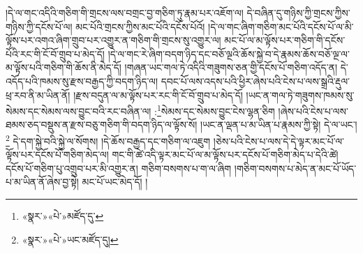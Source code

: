 །དེ་ལ་གང་འདིའི་གཅིག་གི་གྲངས་ལས་བགྲང་བྱ་གཅིག་ཏུ་རྣམ་པར་འཇོག་ལ། དེ་བཞིན་དུ་གཉིས་ཀྱི་གྲངས་ཀྱིས་གཉིས་ཀྱི་དངོས་པོ་ལ། མང་པོའི་གྲངས་ཀྱིས་མང་པོའི་དངོས་པོའོ། །དེ་ལ་གང་ཞིག་གཅིག་མང་པོའི་དངོས་པོ་ལ་མི་ལྟོས་པར་འགའ་ཞིག་གྲུབ་པར་འགྱུར་ན་གཅིག་གི་གྲངས་སུ་འགྱུར་ལ། མང་པོ་ལ་མ་ལྟོས་པར་གཅིག་གི་དངོས་པོའི་རང་གི་ངོ་བོ་གྲུབ་པ་མེད་དོ། །དེ་ལ་གང་རེ་ཞིག་བདག་ཉིད་དང་བཅོ་ལྔའི་ཆོས་སྐྱེ་བ་དེ་རྣམས་ཆོས་བཅོ་ལྔ་ལ་མ་ལྟོས་པའི་གཅིག་གི་ཆོས་ནི་མེད་དོ། །གཞན་ཡང་གལ་ཏེ་འདིའི་གཟུགས་ཅན་གྱི་དངོས་པོ་གཅིག་འདོད་ན། དེ་འདོད་པའི་ཁམས་སུ་རྫས་བརྒྱད་ཀྱི་བདག་ཉིད་ལ། དབང་པོ་ལས་འདས་པའི་ཕྱིར་ཞེས་པའི་ངེས་པ་ལས་སྒྲའི་རྡུལ་ཕྲ་རབ་ནི་མ་ཡིན་ནོ། །རྫས་བདུན་ལ་མ་ལྟོས་པར་རང་གི་ངོ་བོ་གྲུབ་པ་མེད་དོ། །ཡང་ན་གལ་ཏེ་གཟུགས་ཁམས་སུ་སེམས་དང་སེམས་ལས་བྱུང་བའི་རང་བཞིན་ལ། :\footnote{«སྣར་»«པེ་»མཛོད་དུ་}སེམས་དང་སེམས་བྱུང་ངེས་ལྷན་ཅིག །ཞེས་པའི་ངེས་པ་ལས་ཐམས་ཅད་བསྡུས་ན་རྫས་བཅུ་གཅིག་གི་བདག་ཉིད་ལ་ལྟོས་སོ། །ཡང་ན་ལྡན་པ་མ་ཡིན་པ་རྣམས་ཀྱི་སྟེ། དེ་ལ་ཡང་།\footnote{«སྣར་»«པེ་»ཡང་མཛོད་དུ།} དེ་དག་སྐྱེ་བའི་སྐྱེ་ལ་སོགས། །དེ་ཆོས་བརྒྱད་དང་གཅིག་ལ་འཇུག །ཅེས་པའི་ངེས་པ་ལས་དེ་དེ་ལྟར་མང་པོ་ལ་ལྟོས་པར་དངོས་པོ་གཅིག་མེད་ལ། གང་གི་ཚེ་འདི་ལྟར་མང་པོ་ལ་མ་ལྟོས་པར་དངོས་པོ་གཅིག་མེད་པ་དེའི་ཚེ། དངོས་པོ་གཅིག་པུ་འགྲུབ་པར་མི་འགྱུར་ན། གཅིག་བསགས་པ་ག་ལ་ཞིག །གཅིག་བསགས་པ་མེད་ན་མང་པོ་ཡོད་པ་མ་ཡིན་ནོ་ཞེས་བྱ་སྟེ། མང་པོ་ཡང་མེད་དོ། །
